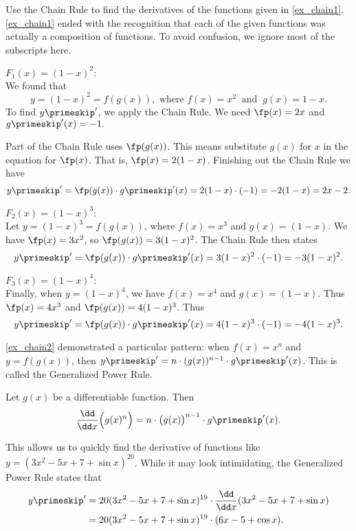 \begin{example}\label{ex_chain2}
Use the Chain Rule to find the derivatives of the functions given in \autoref{ex_chain1}.
\solution
\autoref{ex_chain1} ended with the recognition that each of the given functions was actually a composition of functions. To avoid confusion, we ignore most of the subscripts here.

\noindent $F_1(x) = (1-x)^2:$\\
\indent We found that
\[y=(1-x)^2 = f(g(x)), \text{ where } f(x) = x^2\ \text{ and }\ g(x) = 1-x.\]
To find $y\primeskip'$, we apply the Chain Rule. We need $\fp(x)=2x$ and $g\primeskip'(x)=-1.$

Part of the Chain Rule uses $\fp(g(x))$. This means substitute $g(x)$ for $x$ in the equation for $\fp(x)$. That is, $\fp(x) = 2(1-x)$.  Finishing out the Chain Rule we have
\[y\primeskip' = \fp(g(x))\cdot g\primeskip'(x) = 2(1-x)\cdot (-1) = -2(1-x)= 2x-2.\]

\noindent $F_2(x) = (1-x)^3$:\\
\indent Let $y = (1-x)^3 = f(g(x))$, where $f(x) = x^3$ and $g(x) = (1-x)$. We have $\fp(x) = 3x^2$, so $\fp(g(x)) = 3(1-x)^2$. The Chain Rule then states
\[y\primeskip' = \fp(g(x))\cdot g\primeskip'(x) = 3(1-x)^2\cdot(-1) = -3(1-x)^2.\]

\noindent $F_3(x) = (1-x)^4$:\\
\indent Finally, when $y = (1-x)^4$, we have $f(x)= x^4$ and $g(x) = (1-x)$. Thus $\fp(x) = 4x^3$ and $\fp(g(x)) = 4(1-x)^3$. Thus
\[y\primeskip' = \fp(g(x))\cdot g\primeskip'(x) = 4(1-x)^3\cdot (-1) = -4(1-x)^3.\]
\end{example}

\autoref{ex_chain2} demonstrated a particular pattern: when $f(x)=x^n$ and $y=f(g(x))$, then $y\primeskip' =n\cdot (g(x))^{n-1}\cdot g\primeskip'(x)$. This  is called the Generalized Power Rule.

\begin{theorem}\label{thm:gen_power_rule}
Let $g(x)$ be a differentiable function. Then
\[\frac{\dd}{\dd x}\Bigl(g(x)^n\Bigr) = n\cdot \bigl(g(x)\bigr)^{n-1}\cdot g\primeskip'(x).\]
\end{theorem}

This allows us to quickly find the derivative of functions like $y = (3x^2-5x+7+\sin x)^{20}$. While it may look intimidating, the Generalized Power Rule states that
\begin{align*}
y\primeskip'
&= 20(3x^2 -5x +7 + \sin x)^{19} \cdot  \frac{\dd}{\dd x} (3x^2 -5x +7 + \sin x)\\
&= 20(3x^2-5x+7+\sin x)^{19}\cdot (6x-5+\cos x).
\end{align*}

